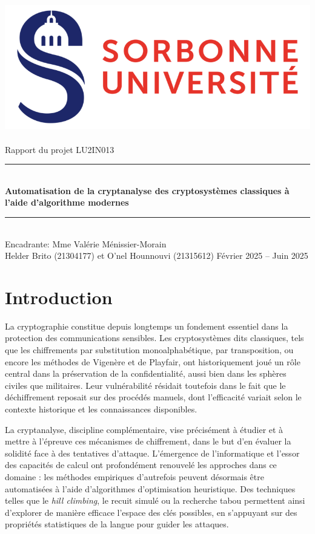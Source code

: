 \documentclass[a4paper]{article}
\begin{document}
\thispagestyle{plain} 
\begin{titlepage} 
    \begin{center} 
        \bigskip 
        \includegraphics[scale=0.5]{logo_su.jpg}~\\[4cm] 
        {\LARGE Rapport du projet LU2IN013}\\[0.3cm] 
        \rule{\linewidth}{0.5mm} \\[0.6cm] 
        {\huge \textbf{Automatisation de la cryptanalyse des cryptosystèmes classiques à l'aide d'algorithme modernes}}\\[0.4cm] 
        \rule{\linewidth}{0.5mm} \\[1cm] {\large Encadrante: Mme Valérie Ménissier-Morain}\\[4cm] 
        {\Large Helder Brito (21304177) et O'nel Hounnouvi (21315612) }
        \vfill Février 2025 -- Juin 2025
    \end{center} 
\end{titlepage}

\newpage

\tableofcontents

\newpage

\section{Introduction}
La cryptographie constitue depuis longtemps un fondement essentiel dans la protection des communications sensibles. Les cryptosystèmes dits classiques, tels que les chiffrements par substitution monoalphabétique, par transposition, ou encore les méthodes de Vigenère et de Playfair, ont historiquement joué un rôle central dans la préservation de la confidentialité, aussi bien dans les sphères civiles que militaires. Leur vulnérabilité résidait toutefois dans le fait que le déchiffrement reposait sur des procédés manuels, dont l’efficacité variait selon le contexte historique et les connaissances disponibles.

La cryptanalyse, discipline complémentaire, vise précisément à étudier et à mettre à l’épreuve ces mécanismes de chiffrement, dans le but d’en évaluer la solidité face à des tentatives d’attaque. L’émergence de l’informatique et l’essor des capacités de calcul ont profondément renouvelé les approches dans ce domaine : les méthodes empiriques d’autrefois peuvent désormais être automatisées à l’aide d’algorithmes d’optimisation heuristique. Des techniques telles que le \textit{hill climbing}, le recuit simulé ou la recherche tabou permettent ainsi d’explorer de manière efficace l’espace des clés possibles, en s’appuyant sur des propriétés statistiques de la langue pour guider les attaques.
\end{document}
